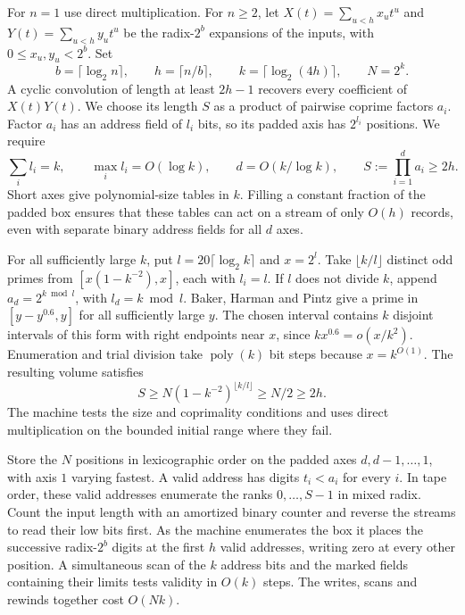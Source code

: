 For \(n=1\) use direct multiplication. For \(n\ge2\), let
\(X(t)=\sum_{u<h}x_u t^u\) and \(Y(t)=\sum_{u<h}y_u t^u\)
be the radix-\(2^b\) expansions of the inputs, with
\(0\le x_u,y_u<2^b\). Set
\[
 b=\lceil\log_2 n\rceil,\qquad h=\lceil n/b\rceil,\qquad
 k=\lceil\log_2(4h)\rceil,\qquad N=2^k.
\]
A cyclic convolution of length at least \(2h-1\) recovers every
coefficient of \(X(t)Y(t)\). We choose its length \(S\) as a product
of pairwise coprime factors \(a_i\). Factor \(a_i\) has an address
field of \(l_i\) bits, so its padded axis has \(2^{l_i}\) positions.
We require
\begin{equation}\label{eq:integer-box}
 \sum_i l_i=k,\qquad \max_i l_i=O(\log k),\qquad
 d=O(k/\log k),\qquad S:=\prod_{i=1}^d a_i\ge 2h .
\end{equation}
Short axes give polynomial-size tables in \(k\). Filling a constant
fraction of the padded box ensures that these tables can act on a
stream of only \(O(h)\) records, even with separate binary address
fields for all \(d\) axes.

For all sufficiently large \(k\), put \(l=20\lceil\log_2 k\rceil\)
and \(x=2^l\). Take \(\lfloor k/l\rfloor\) distinct odd primes
from \([x(1-k^{-2}),x]\), each with \(l_i=l\). If \(l\) does not
divide \(k\), append \(a_d=2^{k\bmod l}\), with \(l_d=k\bmod l\).
Baker, Harman and Pintz \cite{bhp} give a prime in
\([y-y^{0.6},y]\) for all sufficiently large \(y\). The chosen
interval contains \(k\) disjoint intervals of this form with right
endpoints near \(x\), since \(kx^{0.6}=o(x/k^2)\). Enumeration
and trial division take \(\operatorname{poly}(k)\) bit steps because
\(x=k^{O(1)}\). The resulting volume satisfies
\[
 S\ge N(1-k^{-2})^{\lfloor k/l\rfloor}\ge N/2\ge 2h.
\]
The machine tests the size and coprimality conditions and uses
direct multiplication on the bounded initial range where they fail.

Store the \(N\) positions in lexicographic order on the padded
axes \(d,d-1,\ldots,1\), with axis \(1\) varying fastest. A valid
address has digits \(t_i<a_i\) for every \(i\). In tape order, these
valid addresses enumerate the ranks \(0,\ldots,S-1\) in mixed radix.
Count the input length with an amortized binary counter and reverse
the streams to read their low bits first. As the machine enumerates
the box it places the successive radix-\(2^b\) digits at the first
\(h\) valid addresses, writing zero at every other position. A
simultaneous scan of the \(k\) address bits and the marked fields
containing their limits tests validity in \(O(k)\) steps. The writes,
scans and rewinds together cost \(O(Nk)\).

